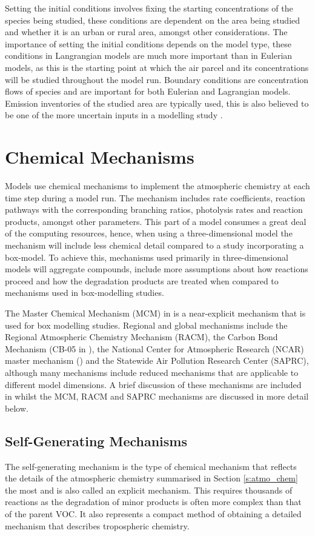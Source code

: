 Setting the initial conditions involves fixing the starting concentrations of the species being studied, these conditions are dependent on the area being studied and whether it is an urban or rural area, amongst other considerations. 
The importance of setting the initial conditions depends on the model type, these conditions in Langrangian models are much more important than in Eulerian models, as this is the starting point at which the air parcel and its concentrations will be studied throughout the model run. 
Boundary conditions are concentration flows of species and are important for both Eulerian and Lagrangian models. 
Emission inventories of the studied area are typically used, this is also believed to be one of the more uncertain inputs in a modelling study \citep{Russell:2000}.

\section{Chemical Mechanisms}
Models use chemical mechanisms to implement the atmospheric chemistry at each time step during a model run. 
The mechanism includes rate coefficients, reaction pathways with the corresponding branching ratios, photolysis rates and reaction products, amongst other parameters. 
This part of a model consumes a great deal of the computing resources, hence, when using a three-dimensional model the mechanism will include less chemical detail compared to a study incorporating a box-model. 
To achieve this, mechanisms used primarily in three-dimensional models will aggregate compounds, include more assumptions about how reactions proceed and how the degradation products are treated when compared to mechanisms used in box-modelling studies.

The Master Chemical Mechanism (MCM) in \citep{Saunders:2003, Jenkin:2003} is a near-explicit mechanism that is used for box modelling studies. 
Regional and global mechanisms include the Regional Atmospheric Chemistry Mechanism (RACM), the Carbon Bond Mechanism (CB-05 in \citep{Yarwood:2005}), the National Center for Atmospheric Research (NCAR) master mechanism (\citep{Madronich:1989}) and the Statewide Air Pollution Research Center (SAPRC), although many mechanisms include reduced mechanisms that are applicable to different model dimensions. 
A brief discussion of these mechanisms are included in \citep{Russell:2000} whilst the MCM, RACM and SAPRC mechanisms are discussed in more detail below.

\subsection{Self-Generating Mechanisms}
The self-generating mechanism is the type of chemical mechanism that reflects the details of the atmospheric chemistry summarised in Section \ref{s:atmo_chem} the most and is also called an explicit mechanism. 
This requires thousands of reactions as the degradation of minor products is often more complex than that of the parent VOC. 
It also represents a compact method of obtaining a detailed mechanism that describes tropospheric chemistry.


